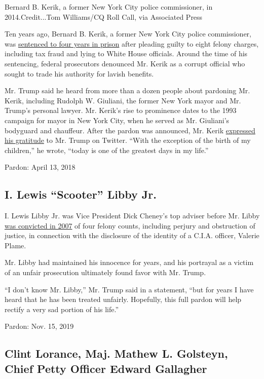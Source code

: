Bernard B. Kerik, a former New York City police commissioner, in
2014.Credit...Tom Williams/CQ Roll Call, via Associated Press

Ten years ago, Bernard B. Kerik, a former New York City police
commissioner, was
\href{https://www.nytimes.com/2010/02/19/nyregion/19kerik.html}{sentenced
to four years in prison} after pleading guilty to eight felony charges,
including tax fraud and lying to White House officials. Around the time
of his sentencing, federal prosecutors denounced Mr. Kerik as a corrupt
official who sought to trade his authority for lavish benefits.

Mr. Trump said he heard from more than a dozen people about pardoning
Mr. Kerik, including Rudolph W. Giuliani, the former New York mayor and
Mr. Trump's personal lawyer. Mr. Kerik's rise to prominence dates to the
1993 campaign for mayor in New York City, when he served as Mr.
Giuliani's bodyguard and chauffeur. After the pardon was announced, Mr.
Kerik
\href{https://twitter.com/BernardKerik/status/1229842151799959555}{expressed
his gratitude} to Mr. Trump on Twitter. ``With the exception of the
birth of my children,'' he wrote, ``today is one of the greatest days in
my life.''

Pardon: April 13, 2018

\hypertarget{i-lewis-scooter-libby-jr}{%
\subsection{I. Lewis ``Scooter'' Libby
Jr.}\label{i-lewis-scooter-libby-jr}}

I. Lewis Libby Jr. was Vice President Dick Cheney's top adviser before
Mr. Libby
\href{https://www.nytimes.com/2007/03/07/washington/07libby.html}{was
convicted in 2007} of four felony counts, including perjury and
obstruction of justice, in connection with the disclosure of the
identity of a C.I.A. officer, Valerie Plame.

Mr. Libby had maintained his innocence for years, and his portrayal as a
victim of an unfair prosecution ultimately found favor with Mr. Trump.

``I don't know Mr. Libby,'' Mr. Trump said in a statement, ``but for
years I have heard that he has been treated unfairly. Hopefully, this
full pardon will help rectify a very sad portion of his life.''

Pardon: Nov. 15, 2019

\hypertarget{clint-lorance-maj-mathew-l-golsteyn-chief-petty-officer-edward-gallagher}{%
\subsection{Clint Lorance, Maj. Mathew L. Golsteyn, Chief Petty Officer
Edward
Gallagher}\label{clint-lorance-maj-mathew-l-golsteyn-chief-petty-officer-edward-gallagher}}


